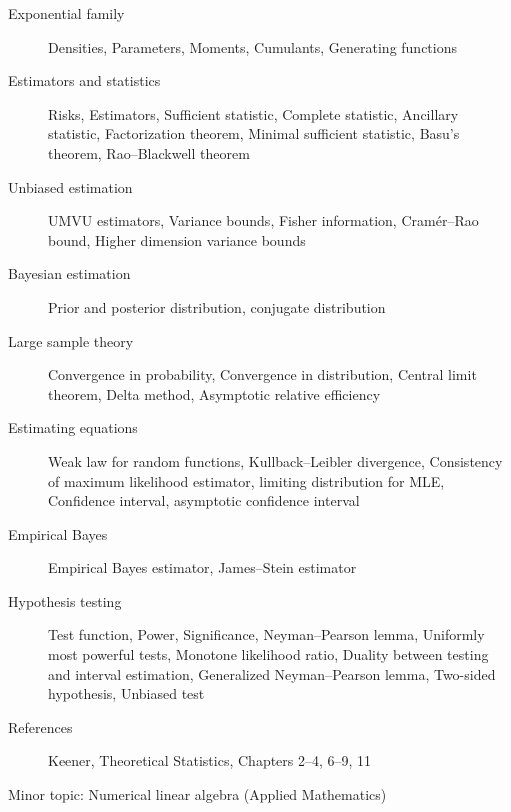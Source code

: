 \documentclass{article}
\begin{document}
\begin{description}
\item[Exponential family] Densities, Parameters, Moments, Cumulants, Generating functions

\item[Estimators and statistics] Risks, Estimators, Sufficient statistic, Complete statistic, Ancillary statistic, Factorization theorem, Minimal sufficient statistic, Basu's theorem, Rao--Blackwell theorem

\item[Unbiased estimation] UMVU estimators, Variance bounds, Fisher information, Cram\'er--Rao bound, Higher dimension variance bounds

\item[Bayesian estimation] Prior and posterior distribution, conjugate distribution

\item[Large sample theory] Convergence in probability, Convergence in distribution, Central limit theorem, Delta method, Asymptotic relative efficiency

\item[Estimating equations] Weak law for random functions, Kullback--Leibler divergence, Consistency of maximum likelihood estimator, limiting distribution for MLE, Confidence interval, asymptotic confidence interval

\item[Empirical Bayes] Empirical Bayes estimator, James--Stein estimator

\item[Hypothesis testing] Test function, Power, Significance, Neyman--Pearson lemma, Uniformly most powerful tests, Monotone likelihood ratio, Duality between testing and interval estimation, Generalized Neyman--Pearson lemma, Two-sided hypothesis, Unbiased test

\item[References] Keener, Theoretical Statistics, Chapters 2--4, 6--9, 11
\end{description}

\vspace{0.2in}

\begin{center}
{\sc Minor topic: Numerical linear algebra (Applied Mathematics)}
\end{center}
\end{document}
